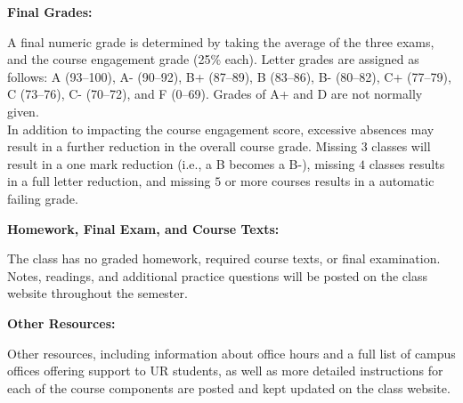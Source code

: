 \documentclass[11pt, a4paper]{article}
\begin{document}
\bigskip

\textbf{Final Grades:} \vspace{6pt}

A final numeric grade is determined by taking the average of the three exams,
and the course engagement grade (25\% each). Letter grades are assigned as
follows: A (93--100), A- (90--92), B+ (87--89), B (83--86), B- (80--82),
C+ (77--79), C (73--76), C- (70--72), and F (0--69). Grades of A+ and D are not
normally given.\\

In addition to impacting the course engagement score, excessive absences may
result in a further reduction in the overall course grade. Missing $3$ classes
will result in a one mark reduction (i.e., a B becomes a B-), missing $4$
classes results in a full letter reduction, and missing $5$ or more courses
results in a automatic failing grade.

\bigskip

\textbf{Homework, Final Exam, and Course Texts:} \vspace{6pt}

The class has no graded homework, required course texts, or final examination.
Notes, readings, and additional practice questions will be posted on the class
website throughout the semester.

\bigskip

\textbf{Other Resources:} \vspace{6pt}

Other resources, including information about office hours and a full list of
campus offices offering support to UR students, as well as more detailed
instructions for each of the course components are posted and kept updated on
the class website.
\end{document}
